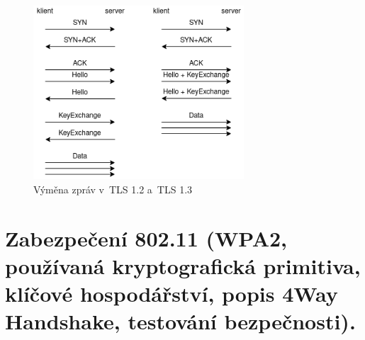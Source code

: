 \begin{figure}[ht]
\centering
\includegraphics[width=0.7\textwidth]{images/tls}
\caption*{Výměna zpráv v~TLS 1.2 a~TLS 1.3}
\end{figure}

\clearpage
\section{Zabezpečení 802.11 (WPA2, používaná kryptografická primitiva, klíčové hospodářství, popis 4Way Handshake, testování bezpečnosti).}
